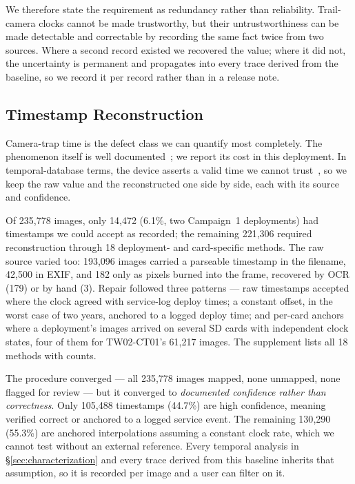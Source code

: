 \documentclass[sigconf]{acmart}
\begin{document}
We therefore state the requirement as redundancy rather than
reliability. Trail-camera clocks cannot be made trustworthy, but their
untrustworthiness can be made detectable and correctable by recording
the same fact twice from two sources. Where a second record existed we
recovered the value; where it did not, the uncertainty is permanent and
propagates into every trace derived from the baseline, so we record it
per record rather than in a release note.

\subsection{Timestamp Reconstruction}
\label{sec:timestamps}

Camera-trap time is the defect class we can quantify most completely.
The phenomenon itself is well
documented~\cite{lahozmonfort2021monitoring}; we report its cost in this
deployment. In temporal-database terms, the device asserts a valid time
we cannot trust~\cite{jensen1999temporal}, so we keep the raw value and
the reconstructed one side by side, each with its source and
confidence.

Of 235{,}778 images, only 14{,}472 (6.1\%, two Campaign~1 deployments)
had timestamps we could accept as recorded; the remaining
221{,}306 required reconstruction through 18 deployment- and
card-specific methods. The raw source varied too: 193{,}096 images
carried a parseable timestamp in the filename, 42{,}500 in EXIF, and
182 only as pixels burned into the frame, recovered by OCR (179) or by
hand (3). Repair followed three patterns --- raw timestamps accepted
where the clock agreed with service-log deploy times; a constant offset,
in the worst case of two years, anchored to a logged deploy time; and
per-card anchors where a deployment's images arrived on several SD cards
with independent clock states, four of them for TW02-CT01's
61{,}217 images. The supplement lists all 18 methods with counts.

The procedure converged --- all 235{,}778 images mapped, none unmapped,
none flagged for review --- but it converged to \emph{documented
confidence rather than correctness}. Only 105{,}488 timestamps (44.7\%)
are high confidence, meaning verified correct or anchored to a logged
service event. The remaining 130{,}290 (55.3\%) are anchored
interpolations assuming a constant clock rate, which we cannot test
without an external reference. Every temporal analysis in
\S\ref{sec:characterization} and every trace derived from this baseline
inherits that assumption, so it is recorded per image and a user can
filter on it.
\end{document}
